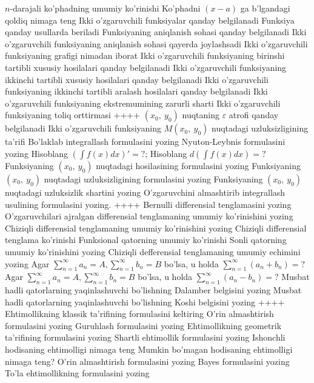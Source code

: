 \(n\)-darajali ko'phadning umumiy ko'rinishi
Ko'phadni \((x - a)\) ga b'lgandagi qoldiq nimaga teng
Ikki o'zgaruvchili funksiyalar qanday belgilanadi
Funksiya qanday usullarda beriladi
Funksiyaning aniqlanish sohasi qanday belgilanadi
Ikki o'zgaruvchili funksiyaning aniqlanish sohasi qayerda joylashsadi
Ikki o'zgaruvchili funksiyaning grafigi nimadan iborat
Ikki o'zgaruvchili funksiyaning birinshi tartibli xususiy hosilalari qanday belgilanadi
Ikki o'zgaruvchili funksiyaning ikkinchi tartibli xususiy hosilalari qanday belgilanadi
Ikki o'zgaruvchili funksiyaning ikkinchi tartibli aralash hosilalari qanday belgilanadi
Ikki o'zgaruvchili funksiyaning ekstremumining zarurli sharti
Ikki o'zgaruvchili funksiyaning toliq orttirmasi
++++
\((x_{0},\ y_{0})\) nuqtaning \(\varepsilon\) atrofi qanday belgilanadi
Ikki o'zgaruvchili funksiyaning \(M(x_{0},\ y_{0})\) nuqtadagi uzluksizligining ta'rifi
Bo'laklab integrallash formulasini yozing
Nyuton-Leybnis formulasini yozing
Hisoblang \(\left( \int {f(x)dx} \right)' = ?\);
Hisoblang \(d\left( \int {f(x)dx} \right) = ?\)
Funksiyaning \((x_{0},\ y_{0})\) nuqtadagi hosilasining formulasini yozing
Funksiyaning \((x_{0},\ y_{0})\) nuqtadagi uzluksizligining formulasini yozing
Funksiyaning \((x_{0},\ y_{0})\) nuqtadagi uzluksizlik shartini yozing
O'zgaruvchini almashtirib integrallash usulining formulasini yozing.
++++
Bernulli differensial tenglamasini yozing
O'zgaruvchilari ajralgan differensial tenglamaning umumiy ko'rinishini yozing
Chiziqli differensial tenglamaning umumiy ko'rinishini yozing
Chiziqli differensial tenglama ko'rinishi
Funksional qatorning umumiy ko'rinishi
Sonli qatorning umumiy ko'rinishini yozing
Chiziqli defferensial tenglamaning umumiy echimini yozing
Agar \(\sum_{n = 1}^{\infty}a_{n} = A,\sum_{n = 1}^{\infty}b_{n} = B\) bo'lsa, u holda \(\sum_{n = 1}^{\infty}\left( a_{n} + b_{n} \right) = ?\)
Agar \(\sum_{n = 1}^{\infty}a_{n} = A,\sum_{n = 1}^{\infty}b_{n} = B\) bo'lsa, u holda \(\sum_{n = 1}^{\infty}\left( a_{n} - b_{n} \right) = ?\)
Musbat hadli qatorlarning yaqinlashuvchi bo'lishning Dalamber belgisini yozing
Musbat hadli qatorlarning yaqinlashuvchi bo'lishning Koshi belgisini yozing
++++
Ehtimollikning klassik ta'rifining formulasini keltiring
O'rin almashtirish formulasini yozing
Guruhlash formulasini yozing
Ehtimollikning geometrik ta'rifining formulasini yozing
Shartli ehtimollik formulasini yozing
Ishonchli hodisaning ehtimolligi nimaga teng
Mumkin bo'magan hodisaning ehtimolligi nimaga teng?
O'rin almashtirish formulasini yozing
Bayes formulasini yozing
To'la ehtimollikning formulasini yozing
